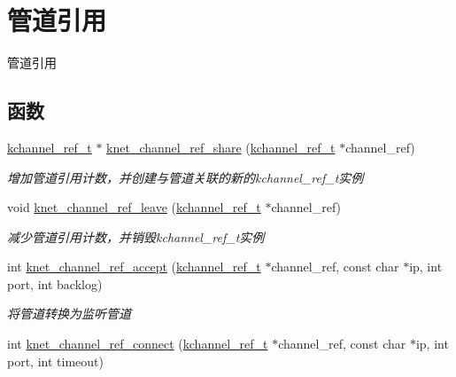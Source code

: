 \hypertarget{a00113}{}\section{管道引用}
\label{a00113}


管道引用  


\subsection*{函数}
\begin{DoxyCompactItemize}
\item 
\hyperlink{a00056_a3b7e82599367eade261456f60ebe2cd9_a3b7e82599367eade261456f60ebe2cd9}{kchannel\+\_\+ref\+\_\+t} $\ast$ \hyperlink{a00113_ga45710b87649c232603ae708616eddd85_ga45710b87649c232603ae708616eddd85}{knet\+\_\+channel\+\_\+ref\+\_\+share} (\hyperlink{a00056_a3b7e82599367eade261456f60ebe2cd9_a3b7e82599367eade261456f60ebe2cd9}{kchannel\+\_\+ref\+\_\+t} $\ast$channel\+\_\+ref)
\begin{DoxyCompactList}\small\item\em 增加管道引用计数，并创建与管道关联的新的kchannel\+\_\+ref\+\_\+t实例 \end{DoxyCompactList}\item 
void \hyperlink{a00113_ga6eded28dc89d84e8ed33615bbd205bae_ga6eded28dc89d84e8ed33615bbd205bae}{knet\+\_\+channel\+\_\+ref\+\_\+leave} (\hyperlink{a00056_a3b7e82599367eade261456f60ebe2cd9_a3b7e82599367eade261456f60ebe2cd9}{kchannel\+\_\+ref\+\_\+t} $\ast$channel\+\_\+ref)
\begin{DoxyCompactList}\small\item\em 减少管道引用计数，并销毁kchannel\+\_\+ref\+\_\+t实例 \end{DoxyCompactList}\item 
int \hyperlink{a00113_ga92a683023f347ae7c4eb692180884a01_ga92a683023f347ae7c4eb692180884a01}{knet\+\_\+channel\+\_\+ref\+\_\+accept} (\hyperlink{a00056_a3b7e82599367eade261456f60ebe2cd9_a3b7e82599367eade261456f60ebe2cd9}{kchannel\+\_\+ref\+\_\+t} $\ast$channel\+\_\+ref, const char $\ast$ip, int port, int backlog)
\begin{DoxyCompactList}\small\item\em 将管道转换为监听管道 \end{DoxyCompactList}\item 
int \hyperlink{a00113_gad8fc0ffe3928e6914b3ec50810e2e79f_gad8fc0ffe3928e6914b3ec50810e2e79f}{knet\+\_\+channel\+\_\+ref\+\_\+connect} (\hyperlink{a00056_a3b7e82599367eade261456f60ebe2cd9_a3b7e82599367eade261456f60ebe2cd9}{kchannel\+\_\+ref\+\_\+t} $\ast$channel\+\_\+ref, const char $\ast$ip, int port, int timeout)

\end{DoxyCompactItemize}
